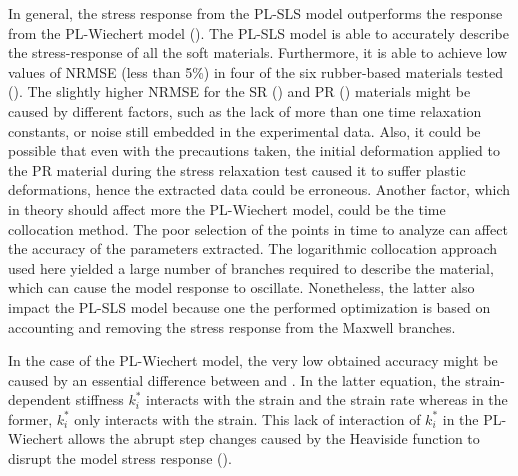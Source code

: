 In general, the stress response from the PL-SLS model outperforms the response from the PL-Wiechert model (). The PL-SLS model is able to accurately describe the stress-response of all the soft materials. Furthermore, it is able to achieve low values of NRMSE (less than 5\%) in four of the six rubber-based materials tested (). The slightly higher NRMSE for the SR () and PR () materials might be caused by different factors, such as the lack of more than one time relaxation constants, or noise still embedded in the experimental data. Also, it could be possible that even with the precautions taken, the initial deformation applied to the PR material during the stress relaxation test caused it to suffer plastic deformations, hence the extracted data could be erroneous. Another factor, which in theory should affect more the PL-Wiechert model, could be the time collocation method. The poor selection of the points in time to analyze can affect the accuracy of the parameters extracted. The logarithmic collocation approach used here yielded a large number of branches required to describe the material, which can cause the model response to oscillate. Nonetheless, the latter also impact the PL-SLS model because one the performed optimization is based on accounting and removing the stress response from the Maxwell branches.

In the case of the PL-Wiechert model, the very low obtained accuracy might be caused by an essential difference between  and . In the latter equation, the strain-dependent stiffness $k_i^*$ interacts with the strain and the strain rate whereas in the former, $k_i^*$ only interacts with the strain. This lack of interaction of $k_i^*$ in the PL-Wiechert allows the abrupt step changes caused by the Heaviside function to disrupt the model stress response ().

